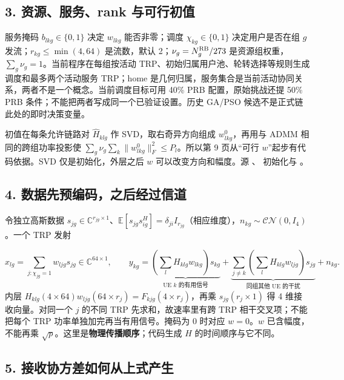 \documentclass[11pt,a4paper]{ctexart}
\begin{document}
\subsection*{3. 资源、服务、rank 与可行初值}

服务掩码 $b_{lkg}\in\{0,1\}$ 决定 $w_{lkg}$ 能否非零；调度 $\chi_{kg}\in\{0,1\}$ 决定用户是否在组 $g$ 发流；$r_{kg}\le\min(4,64)$ 是流数，默认 2；$\nu_g=N_g^{\rm RB}/273$ 是资源组权重，$\sum_g\nu_g=1$。当前程序在每组按活动 TRP、初始归属用户池、轮转选择等规则生成调度和最多两个活动服务 TRP；home 是几何归属，服务集合是当前活动协同关系，两者不是一个概念。当前调度目标可用 40\% PRB 配置，原始挑战还提 50\% PRB 条件；不能把两者写成同一个已验证设置。历史 GA/PSO 候选不是正式链此处的即时决策变量。\par

初值在每条允许链路对 $\widehat H_{klg}$ 作 SVD，取右奇异方向组成 $w^0_{lkg}$，再用与 ADMM 相同的跨组功率投影使 $\sum_g\nu_g\sum_k\|w^0_{lkg}\|_F^2\le P_l$。所以第 9 页从“可行 $w$”起步有代码依据。SVD 仅是初始化，外层之后 $w$ 可以改变方向和幅度。源 、 初始化与 。\par

\subsection*{4. 数据先预编码，之后经过信道}

令独立高斯数据 $s_{jg}\in\mathbb C^{r_{jg}\times1}$、$\mathbb E[s_{jg}s_{ig}^H]=\delta_{ji}I_{r_{jg}}$（相应维度），$n_{kg}\sim\mathcal{CN}(0,I_4)$。一个 TRP 发射\par
\[
x_{lg}=\sum_{j:\chi_{jg}=1}w_{ljg}s_{jg}\in\mathbb C^{64\times1},
\qquad
y_{kg}=\underbrace{\left(\sum_lH_{klg}w_{lkg}\right)s_{kg}}_{\text{UE }k\text{ 的有用信号}}
+\underbrace{\sum_{j\ne k}\left(\sum_lH_{klg}w_{ljg}\right)s_{jg}}_{\text{同组其他 UE 的干扰}}+n_{kg}.
\]
内层 $H_{klg}(4\times64)w_{ljg}(64\times r_j)=F_{kjg}(4\times r_j)$，再乘 $s_{jg}(r_j\times1)$ 得 4 维接收向量。对同一个 $j$ 的不同 TRP 先求和，故速率里有跨 TRP 相干交叉项；不能把每个 TRP 功率单独加完再当有用信号。掩码为 0 时对应 $w=0$。$w$ 已含幅度，不能再乘 $\sqrt p$。这里是\textbf{物理传播顺序}；代码生成 $H$ 的时间顺序与它不同。\par

\subsection*{5. 接收协方差如何从上式产生}
\end{document}
